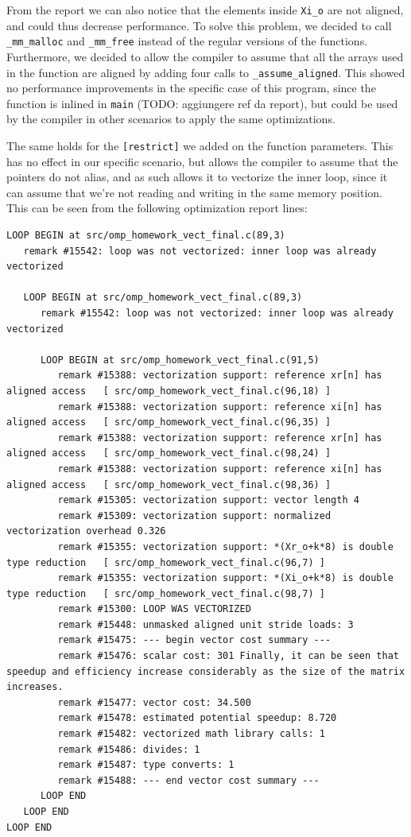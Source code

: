 \documentclass{article}
\begin{document}
From the report we can also notice that the elements inside \verb|Xi_o| are not aligned, and could thus decrease performance. To solve this problem, we decided to call \verb|_mm_malloc| and \verb|_mm_free| instead of the regular versions of the functions. Furthermore, we decided to allow the compiler to assume that all the arrays used in the function are aligned by adding four calls to \verb|_assume_aligned|. This showed no performance improvements in the specific case of this program, since the function is inlined in \verb|main| (TODO: aggiungere ref da report), but could be used by the compiler in other scenarios to apply the same optimizations.

The same holds for the \verb|[restrict]| we added on the function parameters. This has no effect in our specific scenario, but allows the compiler to assume that the pointers do not alias, and as such allows it to vectorize the inner loop, since it can assume that we're not reading and writing in the same memory position. This can be seen from the following optimization report lines:
\begin{verbatim}
LOOP BEGIN at src/omp_homework_vect_final.c(89,3)
   remark #15542: loop was not vectorized: inner loop was already vectorized

   LOOP BEGIN at src/omp_homework_vect_final.c(89,3)
      remark #15542: loop was not vectorized: inner loop was already vectorized

      LOOP BEGIN at src/omp_homework_vect_final.c(91,5)
         remark #15388: vectorization support: reference xr[n] has aligned access   [ src/omp_homework_vect_final.c(96,18) ]
         remark #15388: vectorization support: reference xi[n] has aligned access   [ src/omp_homework_vect_final.c(96,35) ]
         remark #15388: vectorization support: reference xr[n] has aligned access   [ src/omp_homework_vect_final.c(98,24) ]
         remark #15388: vectorization support: reference xi[n] has aligned access   [ src/omp_homework_vect_final.c(98,36) ]
         remark #15305: vectorization support: vector length 4
         remark #15309: vectorization support: normalized vectorization overhead 0.326
         remark #15355: vectorization support: *(Xr_o+k*8) is double type reduction   [ src/omp_homework_vect_final.c(96,7) ]
         remark #15355: vectorization support: *(Xi_o+k*8) is double type reduction   [ src/omp_homework_vect_final.c(98,7) ]
         remark #15300: LOOP WAS VECTORIZED
         remark #15448: unmasked aligned unit stride loads: 3 
         remark #15475: --- begin vector cost summary ---
         remark #15476: scalar cost: 301 Finally, it can be seen that speedup and efficiency increase considerably as the size of the matrix increases.
         remark #15477: vector cost: 34.500 
         remark #15478: estimated potential speedup: 8.720 
         remark #15482: vectorized math library calls: 1 
         remark #15486: divides: 1 
         remark #15487: type converts: 1 
         remark #15488: --- end vector cost summary ---
      LOOP END
   LOOP END
LOOP END
\end{verbatim}
\end{document}
